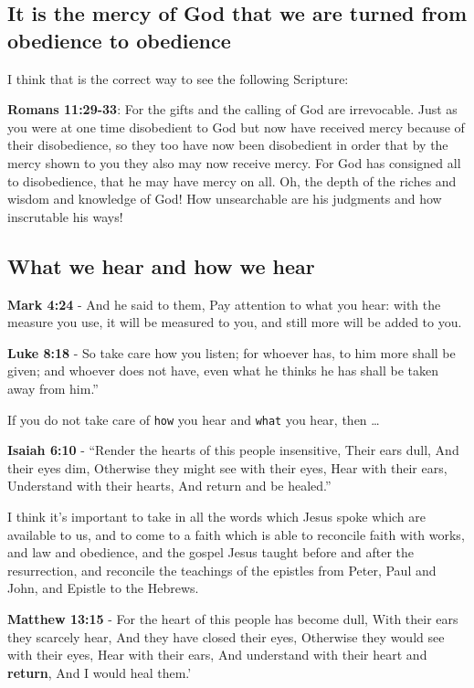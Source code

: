 \documentclass[11pt]{article}
\begin{document}
\subsection{It is the mercy of God that we are turned from obedience to obedience}
\label{sec:orga0bb8e2}
I think that is the correct way to see the following Scripture:

\textbf{Romans 11:29-33}: For the gifts and the calling of God are irrevocable.  Just as you were at one time disobedient to God but now have received mercy because of their disobedience, so they too have now been disobedient in order that by the mercy shown to you they also may now receive mercy.  For God has consigned all to disobedience, that he may have mercy on all.  Oh, the depth of the riches and wisdom and knowledge of God! How unsearchable are his judgments and how inscrutable his ways!

\subsection{What we hear and how we hear}
\label{sec:org525836c}
\textbf{Mark 4:24} - And he said to them, Pay attention to what you hear: with the measure you use, it will be measured to you, and still more will be added to you.

\textbf{Luke 8:18} - So take care how you listen; for whoever has, to him more shall be given; and whoever does not have, even what he thinks he has shall be taken away from him.”

If you do not take care of \texttt{how} you hear and \texttt{what} you hear, then \ldots{}

\textbf{Isaiah 6:10} - “Render the hearts of this people insensitive, Their ears dull, And their eyes dim, Otherwise they might see with their eyes, Hear with their ears, Understand with their hearts, And return and be healed.”

I think it's important to take in all the words which Jesus spoke which are available to us, and to come to a faith which is able to reconcile faith with works, and law and obedience, and the gospel Jesus taught before and after the resurrection, and reconcile the teachings of the epistles from Peter, Paul and John, and Epistle to the Hebrews.

\textbf{Matthew 13:15} - For the heart of this people has become dull, With their ears they scarcely hear, And they have closed their eyes, Otherwise they would see with their eyes, Hear with their ears, And understand with their heart and \textbf{return}, And I would heal them.’
\end{document}
